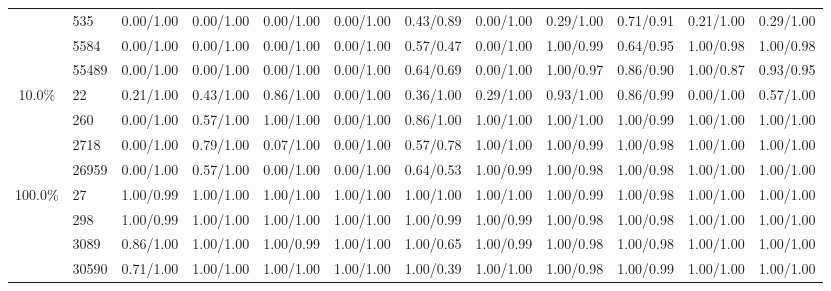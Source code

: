 \documentclass{bmcart}
\begin{document}
\begin{backmatter}
\begin{table}[htbp]
\begin{tabular}{cl|ccccclcllc}
          & 535   & 0.00/1.00 & 0.00/1.00 & \multicolumn{1}{l}{0.00/1.00} & 0.00/1.00 & 0.43/0.89 & 0.00/1.00 & 0.29/1.00 & 0.71/0.91 & 0.21/1.00 & 0.29/1.00 \\
          & 5584  & 0.00/1.00 & 0.00/1.00 & 0.00/1.00 & 0.00/1.00 & 0.57/0.47 & 0.00/1.00 & 1.00/0.99 & 0.64/0.95 & 1.00/0.98 & 1.00/0.98 \\
          & 55489 & 0.00/1.00 & 0.00/1.00 & 0.00/1.00 & 0.00/1.00 & 0.64/0.69 & 0.00/1.00 & 1.00/0.97 & 0.86/0.90 & 1.00/0.87 & 0.93/0.95 \\
    \midrule
    10.0\% & 22    & 0.21/1.00 & 0.43/1.00 & 0.86/1.00 & 0.00/1.00 & 0.36/1.00 & 0.29/1.00 & 0.93/1.00 & 0.86/0.99 & 0.00/1.00 & 0.57/1.00 \\
          & 260   & 0.00/1.00 & 0.57/1.00 & \multicolumn{1}{l}{1.00/1.00} & 0.00/1.00 & 0.86/1.00 & 1.00/1.00 & 1.00/1.00 & 1.00/0.99 & 1.00/1.00 & 1.00/1.00 \\
          & 2718  & 0.00/1.00 & 0.79/1.00 & 0.07/1.00 & 0.00/1.00 & 0.57/0.78 & 1.00/1.00 & 1.00/0.99 & 1.00/0.98 & 1.00/1.00 & 1.00/1.00 \\
          & 26959 & 0.00/1.00 & 0.57/1.00 & 0.00/1.00 & 0.00/1.00 & 0.64/0.53 & 1.00/0.99 & 1.00/0.98 & 1.00/0.98 & 1.00/1.00 & 1.00/1.00 \\
    \midrule
    100.0\% & 27    & 1.00/0.99 & 1.00/1.00 & 1.00/1.00 & 1.00/1.00 & 1.00/1.00 & 1.00/1.00 & 1.00/0.99 & 1.00/0.98 & 1.00/1.00 & 1.00/1.00 \\
          & 298   & 1.00/0.99 & 1.00/1.00 & \multicolumn{1}{l}{1.00/1.00} & 1.00/1.00 & 1.00/0.99 & 1.00/0.99 & 1.00/0.98 & 1.00/0.98 & 1.00/1.00 & 1.00/1.00 \\
          & 3089  & 0.86/1.00 & 1.00/1.00 & 1.00/0.99 & 1.00/1.00 & 1.00/0.65 & 1.00/0.99 & 1.00/0.98 & 1.00/0.98 & 1.00/1.00 & 1.00/1.00 \\
          & 30590 & 0.71/1.00 & 1.00/1.00 & 1.00/1.00 & 1.00/1.00 & 1.00/0.39 & 1.00/1.00 & 1.00/0.98 & 1.00/0.99 & 1.00/1.00 & 1.00/1.00 \\
    \bottomrule
    \end{tabular}
  \label{tab:addlabel}
\end{table}












\end{backmatter}
\end{document}
